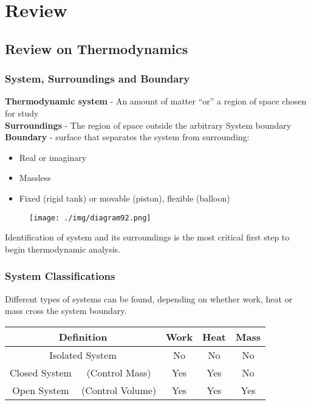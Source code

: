 \chapter{Review}
\section{Review on Thermodynamics}
\subsection{System, Surroundings and Boundary}
\textbf{Thermodynamic system} - An amount of matter “or” a region of space chosen for study \\
\textbf{Surroundings} - The region of space outside the arbitrary System boundary \\
\textbf{Boundary} - surface that separates the system from surrounding:
\begin{itemize}[noitemsep]
  \item Real or imaginary
  \item Massless
  \item Fixed (rigid tank) or movable (piston), flexible (balloon)
\end{itemize}
\begin{figure}[H]
  \centering
  \texttt{[image: ./img/diagram92.png]}
  \caption{}
\end{figure}
Identification of system and its surroundings is the most critical first step to begin thermodynamic analysis.
\subsection{System Classifications}
Different types of systems can be found, depending on whether work, heat or mass cross the system boundary.
\begin{table}[H]
  \centering
  \begin{tabular}{|c|c|c|c|c|}
    \hline
    \multicolumn{2}{|c|}{\textbf{Definition}} & \textbf{Work}    & \textbf{Heat} & \textbf{Mass}       \\ \hline
    \multicolumn{2}{|c|}{Isolated System}     & No               & No            & No                  \\ \hline
    Closed System                             & (Control Mass)   & Yes           & Yes           & No  \\ \hline
    Open System                               & (Control Volume) & Yes           & Yes           & Yes \\ \hline
  \end{tabular}
\end{table}
